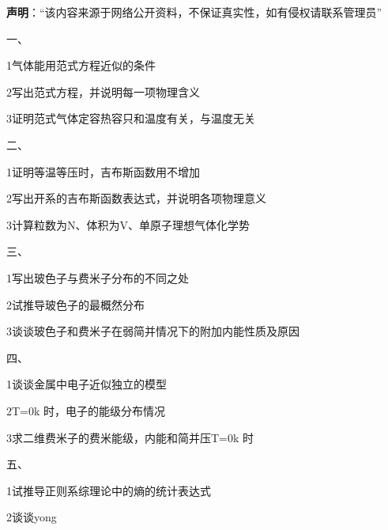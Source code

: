 
\textbf{声明}：“该内容来源于网络公开资料，不保证真实性，如有侵权请联系管理员”



一、

{1}气体能用范式方程近似的条件

{2}写出范式方程，并说明每一项物理含义

{3}证明范式气体定容热容只和温度有关，与温度无关


二、

{1}证明等温等压时，吉布斯函数用不增加

{2}写出开系的吉布斯函数表达式，并说明各项物理意义

{3}计算粒数为N、体积为V、单原子理想气体化学势

三、

{1}写出玻色子与费米子分布的不同之处

{2}试推导玻色子的最概然分布

{3}谈谈玻色子和费米子在弱简并情况下的附加内能性质及原因

四、

{1}谈谈金属中电子近似独立的模型

{2}T=0k 时，电子的能级分布情况

{3}求二维费米子的费米能级，内能和简并压{T=0k 时}

五、

{1}试推导正则系综理论中的熵的统计表达式

{2}谈谈yong